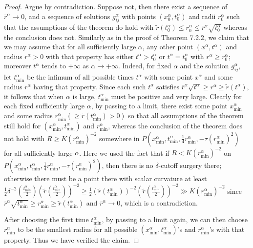 \begin{proof}
Argue by contradiction. Suppose not, then there exist a sequence
of $\bar{r}^{\alpha}\rightarrow0$, and a sequence of solutions
$g^{\alpha}_{ij}$ with points $(x^{\alpha}_0,t^{\alpha}_0)$ and
radii $r^{\alpha}_0$ such that the assumptions of the theorem do
hold with $\widetilde{r}(t^{\alpha}_0)\leq r^{\alpha}_0\leq
\bar{r}^{\alpha}\sqrt{t^{\alpha}_0}$ whereas the conclusion does
not. Similarly as in the proof of Theorem 7.2.2, we claim that we
may assume that for all sufficiently large $\alpha$, any other
point $(x^{\alpha},t^{\alpha})$ and radius $r^{\alpha}>0$ with
that property has either $t^{\alpha}> t^{\alpha}_0$ or
$t^{\alpha}= t^{\alpha}_0$ with $r^{\alpha}\geq r^{\alpha}_0$;
moreover $t^{\alpha}$ tends to $+\infty$ as $\alpha \rightarrow
+\infty$. Indeed, for fixed $\alpha$ and the solution
$g^{\alpha}_{ij}$, let $t^{\alpha}_{\min}$ be the infimum of all
possible times $t^{\alpha}$ with some point $x^{\alpha}$ and some
radius $r^{\alpha}$ having that property. Since each such
$t^{\alpha}$ satisfies $\bar{r}^{\alpha}\sqrt{t^{\alpha}}\geq
r^{\alpha}\geq \widetilde{r}(t^{\alpha})$, it follows that when
$\alpha$ is large, $t^{\alpha}_{\min}$ must be positive and very
large. Clearly for each fixed sufficiently large $\alpha$, by
passing to a limit, there exist some point $x^{\alpha}_{\min}$ and
some radius $r^{\alpha}_{\min}(\geq
\widetilde{r}(t^{\alpha}_{\min})>0)$ so that all assumptions of
the theorem still hold for $(x^{\alpha}_{\min},t^{\alpha}_{\min})$
and $r^{\alpha}_{\min}$, whereas the conclusion of the theorem
does not hold with $R\geq K(r^{\alpha}_{\min})^{-2}$ somewhere in
$P(x^{\alpha}_{\min},t^{\alpha}_{\min},\frac{1}{4}
r^{\alpha}_{\min},-\tau(r^{\alpha}_{\min})^2)$ for all
sufficiently large $\alpha$. Here we used the fact that if $R <
K(r^{\alpha}_{\min})^{-2}$ on
$P(x^{\alpha}_{\min},t^{\alpha}_{\min},\frac{1}{4}
r^{\alpha}_{\min},-\tau(r^{\alpha}_{\min})^2)$, then there is no
$\delta$-cutoff surgery there; otherwise there must be a point
there with scalar curvature at least
$\frac{1}{2}\delta^{-2}(\frac{t^{\alpha}_{\min}}{2})
(\widetilde{r}(\frac{t^{\alpha}_{\min}}{2}))^{-2}
\geq\frac{1}{2}(\widetilde{r}(t^{\alpha}_{\min}))^{-2}
(\widetilde{r}(\frac{t^{\alpha}_{\min}}{2}))^{-2} \gg K
(r^{\alpha}_{\min})^{-2}$ since
$\bar{r}^{\alpha}\sqrt{t^{\alpha}_{\min}}\geq
r^{\alpha}_{\min}\geq \widetilde{r}(t^{\alpha}_{\min})$ and
$\bar{r}^{\alpha} \rightarrow 0$, which is a contradiction.

After choosing the first time $t^{\alpha}_{\min}$, by passing to a
limit again, we can then choose $r^{\alpha}_{\min}$ to be the
smallest radius for all possible
$(x^{\alpha}_{\min},t^{\alpha}_{\min})$'s and
$r^{\alpha}_{\min}$'s with that property. Thus we have verified
the claim.


\end{proof}
